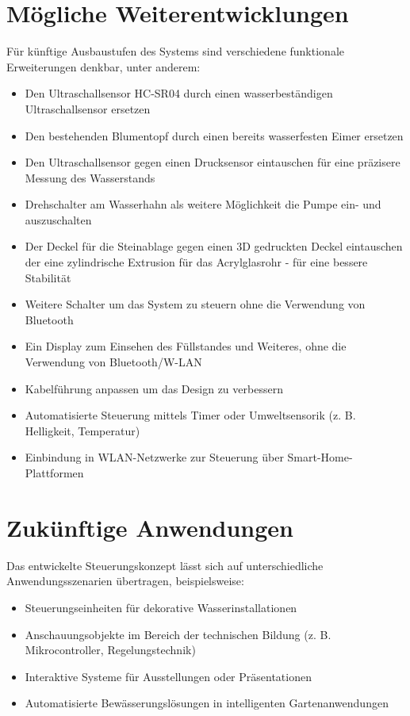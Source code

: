 \section{Mögliche Weiterentwicklungen}
Für künftige Ausbaustufen des Systems sind verschiedene funktionale Erweiterungen denkbar, unter anderem:
\begin{itemize}
	\item Den Ultraschallsensor HC-SR04 durch einen wasserbeständigen Ultraschallsensor ersetzen
	\item Den bestehenden Blumentopf durch einen bereits wasserfesten Eimer ersetzen
	\item Den Ultraschallsensor gegen einen Drucksensor eintauschen für eine präzisere Messung des Wasserstands 
	\item Drehschalter am Wasserhahn als weitere Möglichkeit die Pumpe ein- und auszuschalten
	\item Der Deckel für die Steinablage gegen einen 3D gedruckten Deckel eintauschen der eine zylindrische Extrusion für das Acrylglasrohr - für eine bessere Stabilität 
	\item Weitere Schalter um das System zu steuern ohne die Verwendung von Bluetooth
	\item Ein Display zum Einsehen des Füllstandes und Weiteres, ohne die Verwendung von Bluetooth/W-LAN
	\item Kabelführung anpassen um das Design zu verbessern 
	\item Automatisierte Steuerung mittels Timer oder Umweltsensorik (z. B. Helligkeit, Temperatur)
	\item Einbindung in WLAN-Netzwerke zur Steuerung über Smart-Home-Plattformen

\end{itemize}

\section{Zukünftige Anwendungen}
Das entwickelte Steuerungskonzept lässt sich auf unterschiedliche Anwendungsszenarien übertragen, beispielsweise:
\begin{itemize}
	\item Steuerungseinheiten für dekorative Wasserinstallationen
	\item Anschauungsobjekte im Bereich der technischen Bildung (z. B. Mikrocontroller, Regelungstechnik)
	\item Interaktive Systeme für Ausstellungen oder Präsentationen
	\item Automatisierte Bewässerungslösungen in intelligenten Gartenanwendungen
\end{itemize}